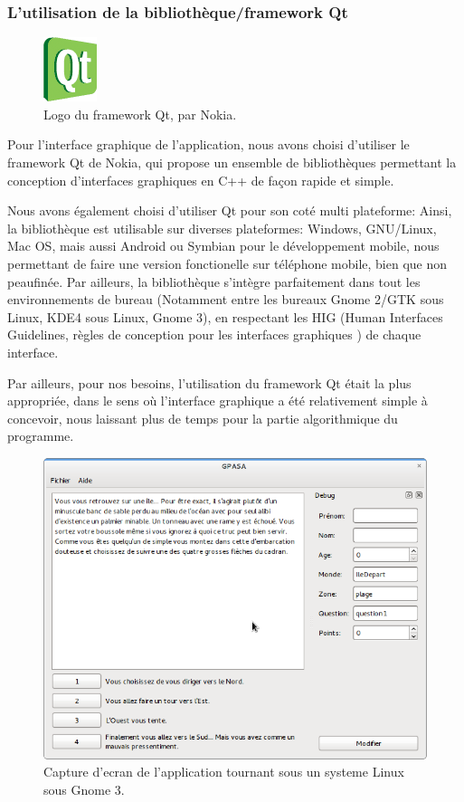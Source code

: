 \subsubsection{L'utilisation de la bibliothèque/framework Qt}
\begin{figure}[h]
\centering
\includegraphics{figures/Qt.png}
\caption{Logo du framework Qt, par Nokia.}
\label{Logo de Qt}
\end{figure}
Pour l'interface graphique de l'application, nous avons choisi d'utiliser le framework Qt de Nokia, qui propose un ensemble de bibliothèques permettant la conception d'interfaces graphiques en C++ de façon rapide et simple.

Nous avons également choisi d'utiliser Qt pour son coté multi plateforme: Ainsi, la bibliothèque est utilisable sur diverses plateformes: Windows, GNU/Linux, Mac OS, mais aussi Android ou Symbian pour le développement mobile, nous permettant de faire une version fonctionelle sur téléphone mobile, bien que non peaufinée. Par ailleurs, la bibliothèque s'intègre parfaitement dans tout les environnements de bureau (Notamment entre les bureaux Gnome 2/GTK sous Linux, KDE4 sous Linux, Gnome 3), en respectant les HIG (Human Interfaces Guidelines, règles de conception pour les interfaces graphiques ) de chaque interface.

Par ailleurs, pour nos besoins, l'utilisation du framework Qt était la plus appropriée, dans le sens où l'interface graphique a été relativement simple à concevoir, nous laissant plus de temps pour la partie algorithmique du programme.

\begin{figure}[p]
\centering
\includegraphics[scale=0.4]{figures/screenshots/gnome3}
\caption{Capture d'ecran de l'application tournant sous un systeme Linux sous Gnome 3.}
\label{CaptureGnome3}
\end{figure}

